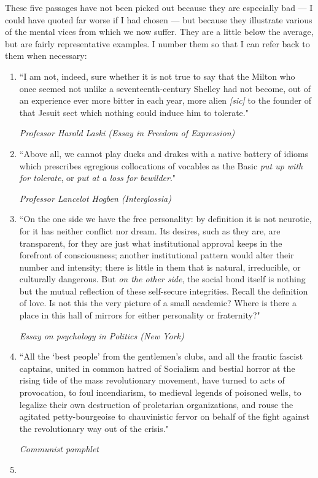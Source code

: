 \documentclass[12pt]{article}
\newcommand{\aquote}[2]{\footnotesize \begin{displayquote} ``#1" \end{displayquote} \hfill \textit{#2}}
\begin{document}
These five passages have not been picked out because they are especially bad — I could have quoted far worse if I had chosen — but because they illustrate various of the mental vices from which we now suffer. They are a little below the average, but are fairly representative examples. I number them so that I can refer back to them when necessary:
\begin{enumerate}
	\item 
	\aquote{I am not, indeed, sure whether it is not true to say that the Milton who once seemed not unlike a seventeenth-century Shelley had not become, out of an experience ever more bitter in each year, more alien \textit{[sic]} to the founder of that Jesuit sect which nothing could induce him to tolerate.}{{Professor Harold Laski (Essay in Freedom of Expression)}} \label{1}
	\item 
	\aquote{Above all, we cannot play ducks and drakes with a native battery of idioms which prescribes egregious collocations of vocables as the Basic \textit{put up with for tolerate}, or \textit{put at a loss for bewilder}.}{Professor Lancelot Hogben (Interglossia)} \label{2}
	\item 
	\aquote{On the one side we have the free personality: by definition it is not neurotic, for it has neither conflict nor dream. Its desires, such as they are, are transparent, for they are just what institutional approval keeps in the forefront of consciousness; another institutional pattern would alter their number and intensity; there is little in them that is natural, irreducible, or culturally dangerous. But \textit{on the other side}, the social bond itself is nothing but the mutual reflection of these self-secure integrities. Recall the definition of love. Is not this the very picture of a small academic? Where is there a place in this hall of mirrors for either personality or fraternity?}{Essay on psychology in Politics (New York)} \label{3}
	\item 
	\aquote{All the `best people’ from the gentlemen's clubs, and all the frantic fascist captains, united in common hatred of Socialism and bestial horror at the rising tide of the mass revolutionary movement, have turned to acts of provocation, to foul incendiarism, to medieval legends of poisoned wells, to legalize their own destruction of proletarian organizations, and rouse the agitated petty-bourgeoise to chauvinistic fervor on behalf of the fight against the revolutionary way out of the crisis.}{Communist pamphlet} \label{4}
	\item 

\end{enumerate}
\end{document}
